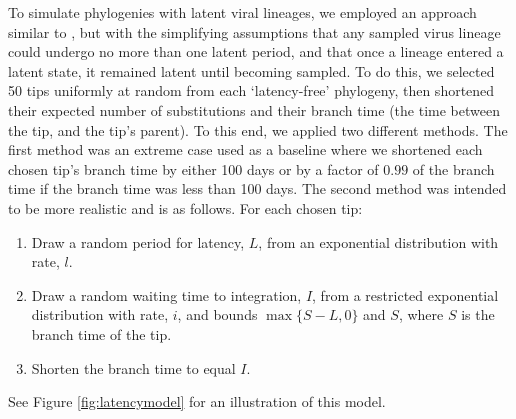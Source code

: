 \documentclass{bmcart}
\begin{document}

To simulate phylogenies with latent viral lineages, we employed an approach similar to \cite{Immonen14}, but with the simplifying assumptions that any sampled virus lineage could undergo no more than one latent period, and that once a lineage entered a latent state, it remained latent until becoming sampled.
To do this, we selected 50 tips uniformly at random from each `latency-free' phylogeny, then shortened their expected number of substitutions and their branch time (the time between the tip, and the tip's parent).
To this end, we applied two different methods.
The first method was an extreme case used as a baseline where we shortened each chosen tip's branch time by either 100 days or by a factor of $0.99$ of the branch time if the branch time was less than 100 days.
The second method was intended to be more realistic and is as follows. For each chosen tip:
\begin{enumerate}
\item Draw a random period for latency, $L$, from an exponential distribution with rate, $l$.
\item Draw a random waiting time to integration, $I$, from a restricted exponential distribution with rate, $i$, and bounds $\max\{S-L, 0\}$ and $S$, where $S$ is the branch time of the tip.
\item Shorten the branch time to equal $I$.
\end{enumerate}
See Figure \ref{fig:latencymodel} for an illustration of this model.
\end{document}
